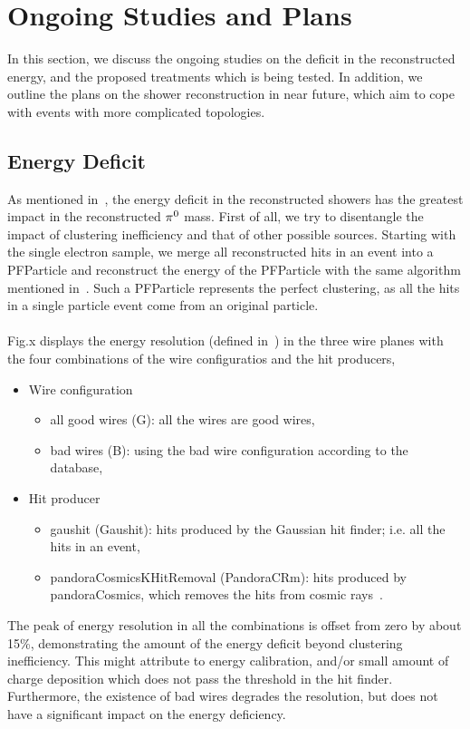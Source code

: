 \section{Ongoing Studies and Plans}
\label{sec:ongoing}

In this section, we discuss the ongoing studies on the deficit in
the reconstructed energy, and the proposed treatments which is being
tested.
In addition, we outline the plans on the shower reconstruction in
near future, which aim to cope with events with more complicated
topologies.

\subsection{Energy Deficit}
\label{sec:energy_deficit}

As mentioned in~, the energy deficit in the reconstructed
showers has the greatest impact in the reconstructed ${\pi}^0$ mass.
First of all, we try to disentangle the impact of clustering inefficiency
and that of other possible sources.
Starting with the single electron sample,
we merge all reconstructed hits in an event into a PFParticle
and reconstruct the energy of the PFParticle with the same algorithm
mentioned in~.
Such a PFParticle represents the perfect clustering, as all the hits
in a single particle event come from an original particle.\\
\\
Fig.x displays the energy resolution (defined in~)
in the three wire planes with the four combinations of the wire configuratios 
and the hit producers,
\begin{itemize}
\item Wire configuration
  \begin{itemize}
  \item all good wires (G): all the wires are good wires,
  \item bad wires (B): using the bad wire configuration according to
        the database,
  \end{itemize}
\item Hit producer
  \begin{itemize}
  \item gaushit (Gaushit): hits produced by the Gaussian hit finder;
        i.e. all the hits in an event,
  \item pandoraCosmicsKHitRemoval (PandoraCRm): hits produced by
        pandoraCosmics, which removes the hits from cosmic rays~\cite{DocDB5828}.
  \end{itemize}
\end{itemize}
The peak of energy resolution in all the combinations is offset
from zero by about 15\%, demonstrating the amount of the energy deficit
beyond clustering inefficiency.
This might attribute to energy calibration, and/or small amount of 
charge deposition which does not pass the threshold in the hit finder.
Furthermore, the existence of bad wires degrades the resolution, but
does not have a significant impact on the energy deficiency.

